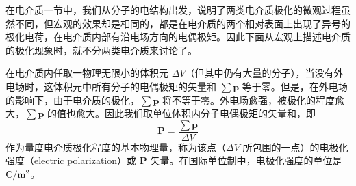 
\begin{issues}
\end{issues}


在电介质一节中，我们从分子的电结构出发，说明了两类电介质极化的微观过程虽然不同，但宏观的效果却是相同的，都是在电介质的两个相对表面上出现了异号的极化电荷，在电介质内部有沿电场方向的电偶极矩。因此下面从宏观上描述电介质的极化现象时，就不分两类电介质来讨论了。

在电介质内任取一物理无限小的体积元 $\Delta V$（但其中仍有大量的分子），当没有外电场时，这体积元中所有分子的电偶极矩的矢量和 $\sum \mathbf p$ 等于零。但是，在外电场的影响下，由于电介质的极化，$\sum \mathbf p$ 将不等于零。外电场愈强，被极化的程度愈大，$\sum \mathbf p$ 的值也愈大。因此我们取单位体积内分子电偶极矩的矢量和，即
\begin{equation}
\mathbf P=\frac{\sum \mathbf p}{\Delta V} 
\end{equation}
作为量度电介质极化程度的基本物理量，称为该点（$\Delta V$ 所包围的一点）的电极化强度（electric polarization）或 $\mathbf P$ 矢量。在国际单位制中，电极化强度的单位是 $\rm C/m^2$。
